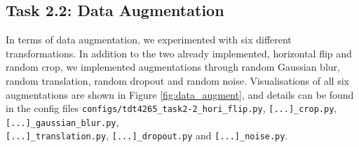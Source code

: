 \documentclass{article}
\begin{document}
\subsection*{Task 2.2: Data Augmentation}
In terms of data augmentation, we experimented with six different transformations. In addition to the two already implemented, horizontal flip and random crop, we implemented augmentations through random Gaussian blur, random translation, random dropout and random noise. Visualisations of all six augmentations are shown in Figure \ref{fig:data_augment}, and details can be found in the config files \texttt{configs/tdt4265\_task2-2\_hori\_flip.py}, \texttt{[...]\_crop.py}, \texttt{[...]\_gaussian\_blur.py},\\ \texttt{[...]\_translation.py}, \texttt{[...]\_dropout.py} and \texttt{[...]\_noise.py}.
\end{document}
